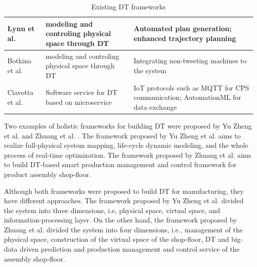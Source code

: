 \documentclass[article,table]{aaltoseries}
\begin{document}
\begin{table}[]
\begin{tabular}{|l|p{4.5cm}|p{7.3cm}|}
		Lynn et al. \cite{lynn2018realization}                                                          & modeling and controling physical space through DT                                     & Automated plan generation; enhanced trajectory planning                                                                                                                                                                                                             \\ \hline
		Botkina et al. \cite{botkina2018digital}                                                           & modeling and controling physical space through DT                                     & Integrating non-tweeting machines to the system                                                                                                                                                                                                                     \\ \hline
		Ciavotta et al. \cite{ciavotta2017microservice} & Software service for DT based on microservice                                         & IoT protocols such as MQTT for CPS communication; AutomationML for data exchange                                                                                                                                                                                    \\ \hline
	\end{tabular}
	\caption{Existing DT frameworks}
	\label{tab:framework_tools}
\end{table}

Two examples of holistic frameworks for building DT were proposed by Yu Zheng et al. \cite{zheng2019application} and Zhuang et al. \cite{Zhuang2018}. The framework proposed by Yu Zheng et al. aims to realize full-physical system mapping, life-cycle dynamic modeling, and the whole process of real-time optimization. The framework proposed by Zhuang et al. aims to build DT-based smart production management and control framework for product assembly shop-floor.

Although both frameworks were proposed to build DT for manufacturing, they have different approaches. The framework proposed by Yu Zheng et al. divided the system into three dimensions, i.e, physical space, virtual space, and information-processing layer. On the other hand, the framework proposed by Zhuang et al. divided the system into four dimensions, i.e., management of the physical space, construction of the virtual space of the shop-floor, DT and big-data driven prediction and production management and control service of the assembly shop-floor.
\end{document}
